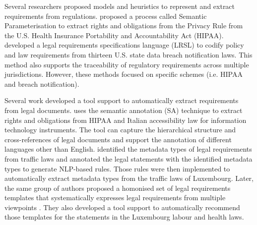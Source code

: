 
Several researchers proposed models and heuristics to represent and extract requirements from regulations. \citeauthor{Breaux2006} \cite{Breaux2006} proposed a process called Semantic Parameterisation to extract rights and obligations from the Privacy Rule from the U.S. Health Insurance Portability and Accountability Act (HIPAA). \citeauthor{Breaux2013} \cite{Breaux2013} developed a legal requirements specifications language (LRSL) to codify policy and law requirements from thirteen U.S. state data breach notification laws. This method also supports the traceability of regulatory requirements across multiple jurisdictions. However, these methods focused on specific schemes (i.e. HIPAA and breach notification).

Several work developed a tool support to automatically extract requirements from legal documents. \citeauthor{Zeni2015} \cite{Zeni2015} uses the semantic annotation (SA) technique to extract rights and obligations from HIPAA and Italian accessibility law for information technology instruments. The tool can capture the hierarchical structure and cross-references of legal documents and support the annotation of different languages other than English. \citeauthor{Sleimi2018} \cite{Sleimi2018} identified the metadata types of legal requirements from traffic laws and annotated the legal statements with the identified metadata types to generate NLP-based rules. Those rules were then implemented to automatically extract metadata types from the traffic laws of Luxembourg. Later, the same group of authors proposed a homonised set of legal requirements templates that systematically expresses legal requirements from multiple viewpoints \cite{Sleimi2020}. They also developed a tool support to automatically recommend those templates for the statements in the Luxembourg labour and health laws.


